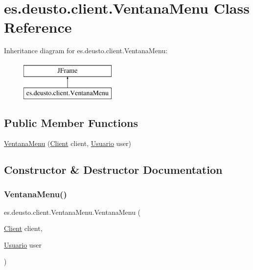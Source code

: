 \hypertarget{classes_1_1deusto_1_1client_1_1_ventana_menu}{}\section{es.\+deusto.\+client.\+Ventana\+Menu Class Reference}
\label{classes_1_1deusto_1_1client_1_1_ventana_menu}
Inheritance diagram for es.\+deusto.\+client.\+Ventana\+Menu\+:\begin{figure}[H]
\begin{center}
\leavevmode
\includegraphics[height=2.000000cm]{classes_1_1deusto_1_1client_1_1_ventana_menu}
\end{center}
\end{figure}
\subsection*{Public Member Functions}
\begin{DoxyCompactItemize}
\item 
\mbox{\hyperlink{classes_1_1deusto_1_1client_1_1_ventana_menu_a7fbd92bbd21b15738ee475e383d54de7}{Ventana\+Menu}} (\mbox{\hyperlink{classes_1_1deusto_1_1client_1_1_client}{Client}} client, \mbox{\hyperlink{classes_1_1deusto_1_1server_1_1jdo_1_1_usuario}{Usuario}} user)
\end{DoxyCompactItemize}


\subsection{Constructor \& Destructor Documentation}
\mbox{\label{classes_1_1deusto_1_1client_1_1_ventana_menu_a7fbd92bbd21b15738ee475e383d54de7}} 
\subsubsection{\texorpdfstring{VentanaMenu()}{VentanaMenu()}}
{\footnotesize\ttfamily es.\+deusto.\+client.\+Ventana\+Menu.\+Ventana\+Menu (\begin{DoxyParamCaption}\item[{\mbox{\hyperlink{classes_1_1deusto_1_1client_1_1_client}{Client}}}]{client,  }\item[{\mbox{\hyperlink{classes_1_1deusto_1_1server_1_1jdo_1_1_usuario}{Usuario}}}]{user }\end{DoxyParamCaption})}



